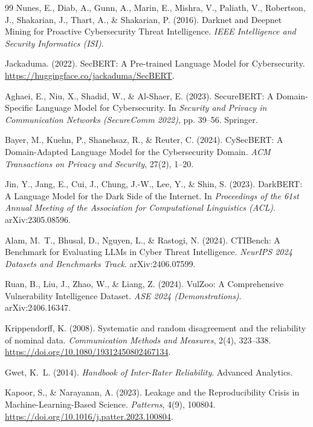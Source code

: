 \documentclass{article}
\begin{document}
\begin{thebibliography}{99}
Nunes, E., Diab, A., Gunn, A., Marin, E., Mishra, V.,
Paliath, V., Robertson, J., Shakarian, J., Thart, A., \&
Shakarian, P. (2016). Darknet and Deepnet Mining for Proactive
Cybersecurity Threat Intelligence. \textit{IEEE Intelligence and
Security Informatics (ISI)}.

Jackaduma. (2022). SecBERT: A Pre-trained Language Model
for Cybersecurity. \url{https://huggingface.co/jackaduma/SecBERT}.

Aghaei, E., Niu, X., Shadid, W., \& Al-Shaer, E. (2023). SecureBERT: A Domain-Specific Language Model for Cybersecurity. In \emph{Security and Privacy in Communication Networks (SecureComm 2022)}, pp. 39--56. Springer.

Bayer, M., Kuehn, P., Shanehsaz, R., \& Reuter, C. (2024). CySecBERT: A Domain-Adapted Language Model for the Cybersecurity Domain. \emph{ACM Transactions on Privacy and Security}, 27(2), 1--20.

Jin, Y., Jang, E., Cui, J., Chung, J.-W., Lee, Y., \& Shin, S. (2023). DarkBERT: A Language Model for the Dark Side of the Internet. In \textit{Proceedings of the 61st Annual Meeting of the Association for Computational Linguistics (ACL)}. arXiv:2305.08596.

Alam, M.\ T., Bhusal, D., Nguyen, L., \& Rastogi, N. (2024). CTIBench: A Benchmark for Evaluating LLMs in Cyber Threat Intelligence. \textit{NeurIPS 2024 Datasets and Benchmarks Track}. arXiv:2406.07599.

Ruan, B., Liu, J., Zhao, W., \& Liang, Z. (2024). VulZoo: A Comprehensive Vulnerability Intelligence Dataset. \textit{ASE 2024 (Demonstrations)}. arXiv:2406.16347.

Krippendorff, K. (2008). Systematic and random disagreement and the
reliability of nominal data. \textit{Communication Methods and Measures},
2(4), 323--338. \url{https://doi.org/10.1080/19312450802467134}.

Gwet, K.\ L. (2014). \textit{Handbook of Inter-Rater Reliability}.
Advanced Analytics.

Kapoor, S., \& Narayanan, A. (2023). Leakage and the Reproducibility
Crisis in Machine-Learning-Based Science. \textit{Patterns}, 4(9),
100804. \url{https://doi.org/10.1016/j.patter.2023.100804}.


\end{thebibliography}
\end{document}

